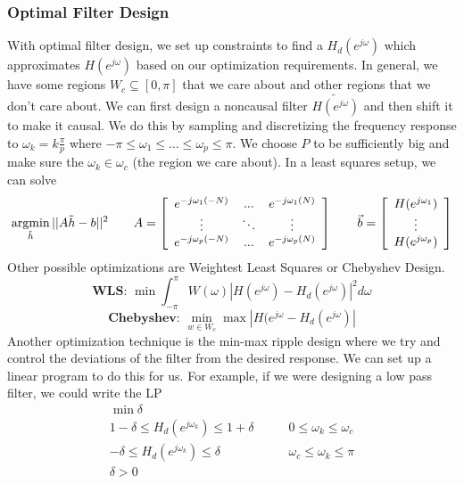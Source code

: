 \subsubsection{Optimal Filter Design}
With optimal filter design, we set up constraints to find a $H_d(e^{j\omega})$ which approximates $H(e^{j\omega})$ based on our optimization requirements.
In general, we have some regions $W_c\subseteq [0, \pi]$ that we care about and other regions that we don't care about. We can first design a noncausal filter $\tilde{H(e^{j\omega})}$ and then shift it to make it causal.
We do this by sampling and discretizing the frequency response to $\omega_k = k\frac{\pi}{p}$ where $-\pi \le \omega_1 \le ... \le \omega_p \le \pi$.
We choose $P$ to be sufficiently big and make sure the $\omega_k \in \omega_c$ (the region we care about).
In a least squares setup, we can solve
\[
  \operatorname*{argmin}_{\tilde{h}}||A\tilde{h}-b||^2 \qquad A = \left[
    \begin{array}{ccc}
      e^{-j\omega_1(-N)} & ... & e^{-j\omega_1(N)}\\
      \vdots & \ddots & \vdots\\
      e^{-j\omega_p(-N)} & ... & e^{-j\omega_p(N)}
    \end{array}
    \right]\qquad
    \vec{b} = \left[
    \begin{array}{c}
      H(e^{j\omega_1})\\
      \vdots\\
      H(e^{j\omega_p})
    \end{array}
    \right]
\]
Other possible optimizations are Weightest Least Squares or Chebyshev Design.
\[
  \textbf{WLS: }\min\int_{-\pi}^{\pi}W(\omega)|H(e^{j\omega}) - H_d(e^{j\omega})|^2d\omega
\]
\[
  \textbf{Chebyshev: }\min_{w\in W_c} \max|H(e^{j\omega}-H_d(e^{j\omega})|
\]
Another optimization technique is the min-max ripple design where we try and control the deviations of the filter from the desired response.
We can set up a linear program to do this for us. For example, if we were designing a low pass filter, we could write the LP
\begin{align*}
  \min \delta\\
  1-\delta \le H_d(e^{j\omega_k})\le 1+\delta &\qquad 0\le \omega_k \le \omega_c\\
  -\delta \le H_d(e^{j\omega_k})\le \delta &\qquad \omega_c\le \omega_k \le \pi\\
  \delta > 0
\end{align*}


